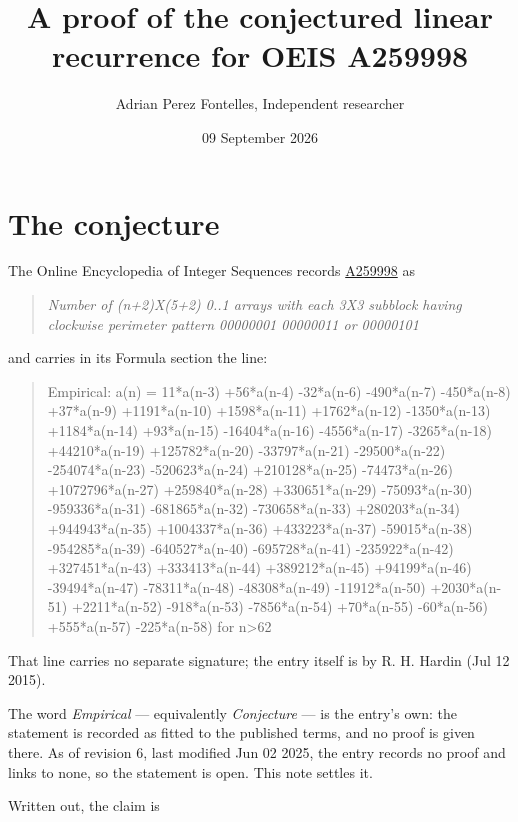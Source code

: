 \documentclass[11pt]{article}
\title{A proof of the conjectured linear recurrence for OEIS A259998}
\author{Adrian Perez Fontelles, Independent researcher}
\date{09 September 2026}
\theoremstyle{definition}
\begin{document}
\maketitle
\section{The conjecture}

The Online Encyclopedia of Integer Sequences records \href{https://oeis.org/A259998}{A259998} as

\begin{quote}\itshape Number of (n+2)X(5+2) 0..1 arrays with each 3X3 subblock having clockwise perimeter pattern 00000001 00000011 or 00000101\end{quote}

and carries in its Formula section the line:

\begin{quote}\ttfamily Empirical: a(n) = 11*a(n-3) +56*a(n-4) -32*a(n-6) -490*a(n-7) -450*a(n-8) +37*a(n-9) +1191*a(n-10) +1598*a(n-11) +1762*a(n-12) -1350*a(n-13) +1184*a(n-14) +93*a(n-15) -16404*a(n-16) -4556*a(n-17) -3265*a(n-18) +44210*a(n-19) +125782*a(n-20) -33797*a(n-21) -29500*a(n-22) -254074*a(n-23) -520623*a(n-24) +210128*a(n-25) -74473*a(n-26) +1072796*a(n-27) +259840*a(n-28) +330651*a(n-29) -75093*a(n-30) -959336*a(n-31) -681865*a(n-32) -730658*a(n-33) +280203*a(n-34) +944943*a(n-35) +1004337*a(n-36) +433223*a(n-37) -59015*a(n-38) -954285*a(n-39) -640527*a(n-40) -695728*a(n-41) -235922*a(n-42) +327451*a(n-43) +333413*a(n-44) +389212*a(n-45) +94199*a(n-46) -39494*a(n-47) -78311*a(n-48) -48308*a(n-49) -11912*a(n-50) +2030*a(n-51) +2211*a(n-52) -918*a(n-53) -7856*a(n-54) +70*a(n-55) -60*a(n-56) +555*a(n-57) -225*a(n-58) for n>62\end{quote}

That line carries no separate signature; the entry itself is by R. H. Hardin (Jul 12 2015).

The word {\itshape Empirical} --- equivalently {\itshape Conjecture} --- is the entry's own: the statement is recorded as fitted to the published terms, and no proof is given there. As of revision 6, last modified Jun 02 2025, the entry records no proof and links to none, so the statement is open. This note settles it.

Written out, the claim is
\end{document}
